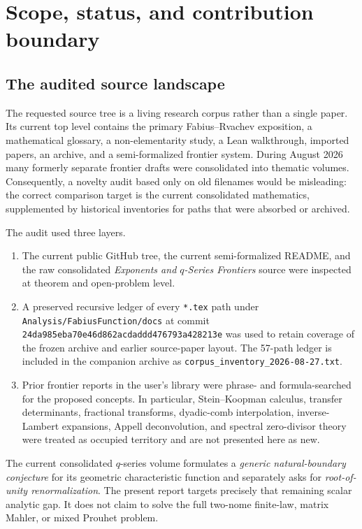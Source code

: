 \documentclass[11pt]{article}
\theoremstyle{definition}
\begin{document}
\tableofcontents
\clearpage

\section{Scope, status, and contribution boundary}

\subsection{The audited source landscape}

The requested source tree is a living research corpus rather than a single paper.  Its current top level contains the primary Fabius--Rvachev exposition, a mathematical glossary, a non-elementarity study, a Lean walkthrough, imported papers, an archive, and a semi-formalized frontier system.  During August 2026 many formerly separate frontier drafts were consolidated into thematic volumes.  Consequently, a novelty audit based only on old filenames would be misleading: the correct comparison target is the current consolidated mathematics, supplemented by historical inventories for paths that were absorbed or archived.

The audit used three layers.
\begin{enumerate}[label=\arabic*.]
\item The current public GitHub tree, the current semi-formalized README, and the raw consolidated \emph{Exponents and $q$-Series Frontiers} source were inspected at theorem and open-problem level.
\item A preserved recursive ledger of every \texttt{*.tex} path under \texttt{Analysis/FabiusFunction/docs} at commit
\texttt{24da985eba70e46d862acdaddd476793a428213e} was used to retain coverage of the frozen archive and earlier source-paper layout.  The 57-path ledger is included in the companion archive as
\texttt{corpus\_inventory\_2026-08-27.txt}.
\item Prior frontier reports in the user's library were phrase- and formula-searched for the proposed concepts.  In particular, Stein--Koopman calculus, transfer determinants, fractional transforms, dyadic-comb interpolation, inverse-Lambert expansions, Appell deconvolution, and spectral zero-divisor theory were treated as occupied territory and are not presented here as new.
\end{enumerate}

The current consolidated $q$-series volume formulates a \emph{generic natural-boundary conjecture} for its geometric characteristic function and separately asks for \emph{root-of-unity renormalization}.  The present report targets precisely that remaining scalar analytic gap.  It does not claim to solve the full two-nome finite-law, matrix Mahler, or mixed Prouhet problem.
\end{document}
